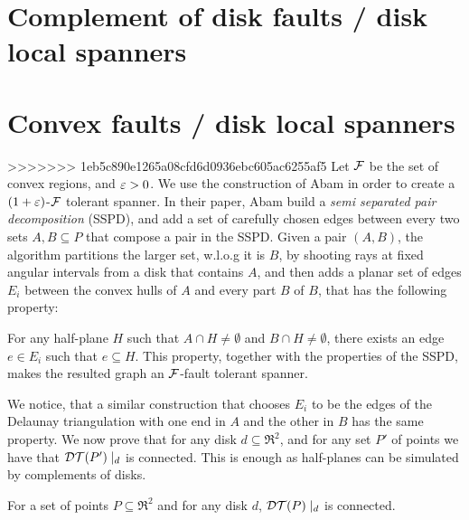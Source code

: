 \documentclass[12pt]{article}%
\begin{document}
	
\section{Complement of disk faults / disk local spanners}
	
	
\section{Convex faults / disk local spanners}
>>>>>>> 1eb5c890e1265a08cfd6d0936ebc605ac6255af5
Let $\mathcal{F}$ be the set of convex regions, and $\varepsilon>0$. We use the
construction of Abam \etal \cite{abfg-rftgs-09} in order to create a
$(1+\varepsilon)$-$\mathcal{F}$ tolerant spanner. In their paper, Abam \etal build a
\emph{semi separated pair decomposition} (SSPD), and add a set of
carefully chosen edges between every two sets $A,B\subseteq P$ that
compose a pair in the SSPD. Given a pair $(A,B)$, the algorithm
partitions the larger set, w.l.o.g it is $B$, by shooting rays at
fixed angular intervals from a disk that contains $A$, and then adds a
planar set of edges $E_i$ between the convex hulls of $A$ and every
part $B$ of $B$, that has the following property:

For any half-plane $H$ such that $A\cap H\neq \emptyset$ and
$B\cap H\neq \emptyset$, there exists an edge $e\in E_i$ such that
$e\subseteq H$. This property, together with the properties of the
SSPD, makes the resulted graph an $\mathcal{F}$-fault tolerant spanner.

We notice, that a similar construction that chooses $E_i$ to be the
edges of the Delaunay triangulation with one end in $A$ and the other
in $B$ has the same property. We now prove that for any disk
$d\subseteq \Re^2$, and for any set $P'$ of points we have that
$\mathcal{DT}(P')\mid_d$ is connected. This is enough as half-planes can be
simulated by complements of disks.

\begin{claim}
    For a set of points $P\subseteq \Re^2$ and for any disk $d$,
    $\mathcal{DT}(P)\mid_d$ is connected.
\end{claim}
\end{document}
